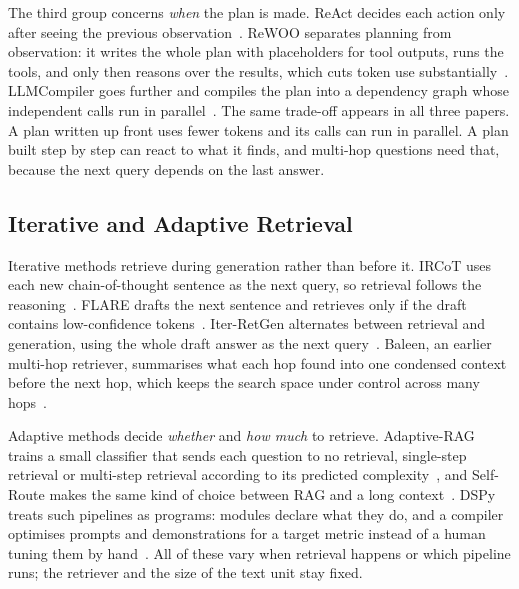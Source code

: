 \documentclass[pdflatex,sn-mathphys-num]{sn-jnl}%
\begin{document}
The third group concerns \emph{when} the plan is made. ReAct decides each action only after seeing the previous observation~\cite{yao2023react}. ReWOO separates planning from observation: it writes the whole plan with placeholders for tool outputs, runs the tools, and only then reasons over the results, which cuts token use substantially~\cite{xu2023rewoo}. LLMCompiler goes further and compiles the plan into a dependency graph whose independent calls run in parallel~\cite{kim2024llmcompiler}. The same trade-off appears in all three papers. A plan written up front uses fewer tokens and its calls can run in parallel. A plan built step by step can react to what it finds, and multi-hop questions need that, because the next query depends on the last answer.

\subsection{Iterative and Adaptive Retrieval}
Iterative methods retrieve during generation rather than before it. IRCoT uses each new chain-of-thought sentence as the next query, so retrieval follows the reasoning~\cite{trivedi2023ircot}. FLARE drafts the next sentence and retrieves only if the draft contains low-confidence tokens~\cite{jiang2023flare}. Iter-RetGen alternates between retrieval and generation, using the whole draft answer as the next query~\cite{shao2023iterretgen}. Baleen, an earlier multi-hop retriever, summarises what each hop found into one condensed context before the next hop, which keeps the search space under control across many hops~\cite{khattab2021baleen}.

Adaptive methods decide \emph{whether} and \emph{how much} to retrieve. Adaptive-RAG trains a small classifier that sends each question to no retrieval, single-step retrieval or multi-step retrieval according to its predicted complexity~\cite{jeong2024adaptiverag}, and Self-Route makes the same kind of choice between RAG and a long context~\cite{li2024ragvslc}. DSPy treats such pipelines as programs: modules declare what they do, and a compiler optimises prompts and demonstrations for a target metric instead of a human tuning them by hand~\cite{khattab2024dspy}. All of these vary when retrieval happens or which pipeline runs; the retriever and the size of the text unit stay fixed.

\end{document}
